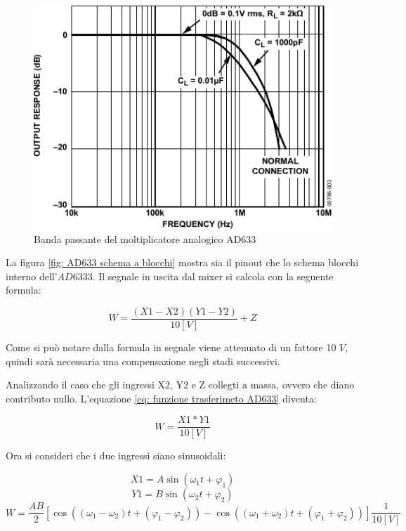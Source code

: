 \documentclass[titlepage]{report}
\begin{document}
	\begin{figure}[H]
		\centering
		\includegraphics[scale=1]{Immagini/ad633_bp.pdf}
		\caption{Banda passante del moltiplicatore analogico AD633}
		\label{fig:sch_ad633}
	\end{figure}

	
	\noindent La figura \ref{fig: AD633 schema a blocchi} mostra sia il pinout che lo schema  blocchi interno dell'$AD6333$. Il segnale in uscita dal mixer si calcola con la seguente formula:

	\begin{equation}
		\label{eq: funzione trasferimeto AD633}
		W = \frac{(X1 - X2)(Y1 - Y2)}{10 [V]}  + Z 
	\end{equation}

	Come si può notare dalla formula in segnale viene attenuato di un fattore 10 $V$, quindi sarà necessaria una compensazione negli stadi successivi. 

	\noindent Analizzando il caso che gli ingressi X2, Y2 e Z collegti a massa, ovvero che diano contributo nullo. L'equazione \ref*{eq: funzione trasferimeto AD633} diventa:


	\begin{equation}
		\label{eq: prodotto sinusoidi AD633}
		W = \frac{X1 * Y1}{10 [V]}
	\end{equation}


	Ora si consideri che i due ingressi siano sinusoidali:


	\begin{equation}
		\label{eq: X1 sinusoidale}
		X1 = A\sin (\omega _1t + \varphi _1)
	\end{equation}
	\begin{equation}
		\label{eq: XY sinusoidale}
		Y1 = B\sin (\omega _2t + \varphi _2)
	\end{equation}
	\begin{equation}
		\label{eq:prodotto sinusoidi con fase}
		W = \frac{AB}{2}[\cos ((\omega _1 - \omega _2)t + (\varphi _1 - \varphi _2)) - \cos ((\omega _1 +\omega _2)t + (\varphi _1 + \varphi _2))]\frac{1}{10[V]}
	\end{equation}
\end{document}
